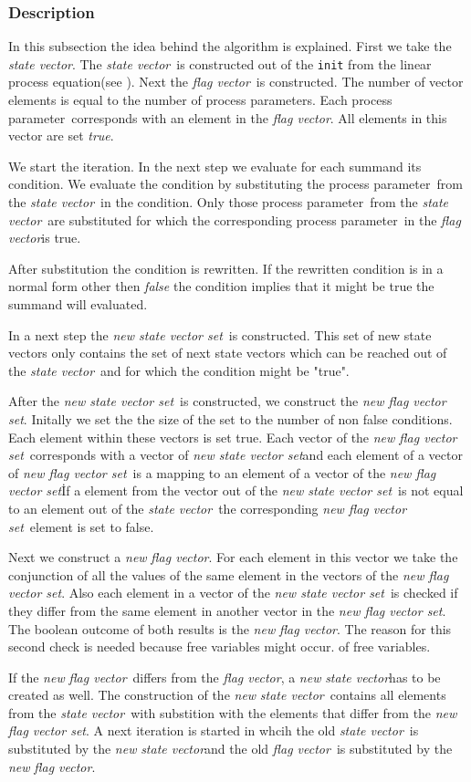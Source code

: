 \documentclass[a4paper,10pt]{article}
\newcommand{\lpe}{linear process equation}
\newcommand{\pp}{process parameter}
\newcommand{\pps}{process parameters}
\newcommand{\ti}{\textit}
\newcommand{\sv}{\textit{state vector}}
\newcommand{\fv}{\textit{flag vector}}
\newcommand{\svs}{\textit{new state vector set}}
\newcommand{\fvs}{\textit{new flag vector set}}
\begin{document}
\subsubsection{Description}\label{sss:desc}
In this subsection the idea behind the algorithm is explained. First we take the \sv . The \sv\ is constructed out of the \verb"init" from the \lpe (see \cite{LPE_info}). Next the \fv\ is constructed. The number of vector elements is equal to the number of \pps . Each \pp\ corresponds with an element in the \fv .  All elements in this vector are set \ti{true}.

 We start the iteration. In the next step we evaluate for each summand its condition. We evaluate the condition by substituting the \pp\ from the \sv\ in the condition. Only those \pp\ from the \sv\ are substituted for which the corresponding \pp\ in the \fv is true. 

After substitution the condition is rewritten. If the rewritten condition is in a normal form other then \ti{false} the condition implies that it might be true the summand will evaluated. 

In a next step the \svs\ is constructed. This set of new state vectors only contains the set of next state vectors which can be reached out of the \sv\ and for which the condition might be "true". 

After the \svs\ is constructed, we construct the \fvs . Initally we set the the size of the set to the number of non false conditions. Each element within  these vectors is set true. Each vector of the \fvs\ corresponds with a vector of \svs and each element of a vector of \fvs\ is a mapping to an element of a vector of the \fvs\. If a element from the vector out of the \svs\ is not equal to an element out of the \sv\ the corresponding \fvs\ element is set to false. 

Next we construct a \ti{new} \fv . For each element in this vector we take the conjunction of all the values of the same element in the vectors of the \fvs . Also each element in a vector of the \svs\ is checked if they differ from the same element in another vector in the \fvs . The boolean outcome of both results is the \ti{new} \fv . The reason for this second check is needed because free variables might occur.
of free variables. %
 
If the \ti{new} \fv\ differs from the \fv , a \ti{new} \sv has to be created as well. The construction of the \ti{new} \sv\ contains all elements from the \sv\ with substition with the elements that differ from the \fvs . 
A next iteration is started in whcih the old \sv\ is substituted by the \ti{new} \sv and the old \fv\ is substituted by the \ti{new} \fv .
  
\end{document}
